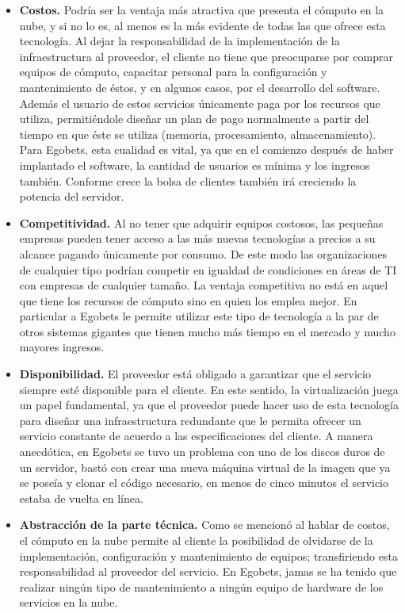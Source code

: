 \begin{itemize}
	\item \textbf{Costos.} Podría ser la ventaja más atractiva que presenta el cómputo en la nube, y si no lo es, al menos es la más evidente de todas las que ofrece esta tecnología. Al dejar la responsabilidad de la implementación de la infraestructura al proveedor, el cliente no tiene que preocuparse por comprar equipos de cómputo, capacitar personal para la configuración y mantenimiento de éstos, y en algunos casos, por el desarrollo del software. Además el usuario de estos servicios únicamente paga por los recursos que utiliza, permitiéndole diseñar un plan de pago normalmente a partir del tiempo en que éste se utiliza (memoria, procesamiento, almacenamiento). Para Egobets, esta cualidad es vital, ya que en el comienzo después de haber implantado el software, la cantidad de usuarios es mínima y los ingresos también. Conforme crece la bolsa de clientes también irá creciendo la potencia del servidor.

	\item \textbf{Competitividad.} Al no tener que adquirir equipos costosos, las pequeñas empresas pueden tener acceso a las más nuevas tecnologías a precios a su alcance pagando únicamente por consumo. De este modo las organizaciones de cualquier tipo podrían competir en igualdad de condiciones en áreas de TI con empresas de cualquier tamaño. La ventaja competitiva no está en aquel que tiene los recursos de cómputo sino en quien los emplea mejor. En particular a Egobets le permite utilizar este tipo de tecnología a la par de otros sistemas gigantes que tienen mucho más tiempo en el mercado y mucho mayores ingresos.

	\item \textbf{Disponibilidad.} El proveedor está obligado a garantizar que el servicio siempre esté disponible para el cliente. En este sentido, la virtualización juega un papel fundamental, ya que el proveedor puede hacer uso de esta tecnología para diseñar una infraestructura redundante que le permita ofrecer un servicio constante de acuerdo a las especificaciones del cliente. A manera anecdótica, en Egobets se tuvo un problema con uno de los discos duros de un servidor, bastó con crear una nueva máquina virtual de la imagen que ya se poseía y clonar el código necesario, en menos de cinco minutos el servicio estaba de vuelta en línea.


	\item \textbf{Abstracción de la parte técnica.} Como se mencionó al hablar de costos, el cómputo en la nube permite al cliente la posibilidad de olvidarse de la implementación, configuración y mantenimiento de equipos; transfiriendo esta responsabilidad al proveedor del servicio. En Egobets, jamas se ha tenido que realizar ningún tipo de mantenimiento a ningún equipo de hardware de los servicios en la nube.


\end{itemize}
